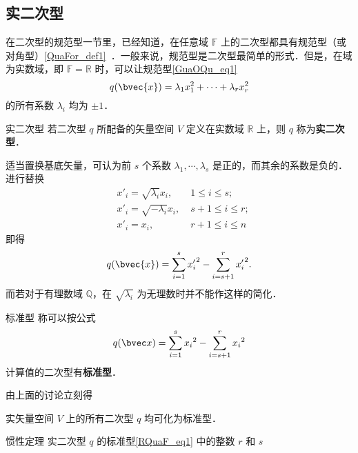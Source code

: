 
\begin{issues}
\issueDraft
\end{issues}

\subsection{实二次型}
在二次型的规范型一节里，已经知道，在任意域 $\mathbb F$ 上的二次型都具有规范型（或对角型）\autoref{QuaFor_def1}~．一般来说，规范型是二次型最简单的形式．但是，在域为实数域，即 $\mathbb F=\mathbb R$ 时，可以让规范型\autoref{GuaOQu_eq1}~
\begin{equation}
q(\bvec{x})=\lambda_1 x_1^2+\cdots+\lambda_r x_r^2
\end{equation}
的所有系数 $\lambda_i$ 均为 $\pm 1$．
\begin{definition}{实二次型}
若二次型 $q$ 所配备的矢量空间 $V$ 定义在实数域 $\mathbb R$ 上，则 $q$ 称为\textbf{实二次型}．
\end{definition}
适当置换基底矢量，可认为前 $s$ 个系数 $\lambda_1,\cdots,\lambda_s$ 是正的，而其余的系数是负的．进行替换
\begin{equation}
\begin{aligned}
&x'_i=\sqrt{\lambda_i}x_i,\;&1\leq i\leq s;\\
&x'_i=\sqrt{-\lambda_i}x_i,\;&s+1\leq i\leq r;\\
&x'_i=x_i,\; &r+1\leq i\leq n
\end{aligned}
\end{equation}
 即得
 \begin{equation}
 q(\bvec{x})=\sum_{i=1}^{s}{x'_i}^2-\sum_{i=s+1}^{r} {x'_{i}}^{2}.
 \end{equation}
 而若对于有理数域 $\mathbb Q$，在 $\sqrt{\lambda_i}$ 为无理数时并不能作这样的简化．
 
\begin{definition}{标准型}
称可以按公式
\begin{equation}\label{RQuaF_eq1}
q(\bvec x)=\sum_{i=1}^{s}{x_i}^2-\sum_{i=s+1}^{r} {x_{i}}^{2}
\end{equation}
计算值的二次型有\textbf{标准型}．
\end{definition}
由上面的讨论立刻得
\begin{theorem}{}
实矢量空间 $V$ 上的所有二次型 $q$ 均可化为标准型．
\end{theorem}
\begin{theorem}{惯性定理}
实二次型 $q$ 的标准型\autoref{RQuaF_eq1} 中的整数 $r$ 和 $s$
\end{theorem}